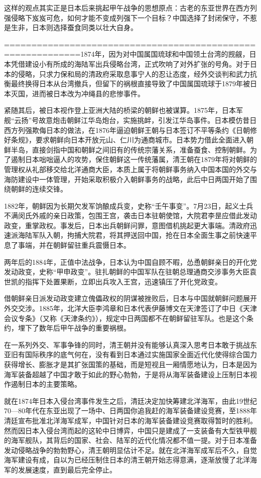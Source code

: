 \documentclass[12pt,UTF8]{ctexbook}
\begin{document}
这样的观点其实正是日本后来挑起甲午战争的思想原点：古老的东亚世界在西方列强侵略下岌岌可危，如何才能不变成列强下一个目标？中国选择了封闭保守，不惹是生非，日本则选择蚕食同类以壮大自身。

============================================================1874年，因为对中国属国琉球和中国领土台湾的觊觎，日本凭借建设小有所成的海陆军出兵侵略台湾，正式吹响了对外扩张的号角。对于日本的侵略，只求力保和局的清政府采取息事宁人的忍让态度，经外交谈判和武力抗衡最终换得日本从台湾撤兵，但留下的祸根直接导致了中国属国琉球于1879年被日本灭国，进而被日本改为冲绳县的悲惨事件。

紧随其后，被日本视作登上亚洲大陆的桥梁的朝鲜也被谋算。1875年，日本军舰“云扬”号故意炮击朝鲜江华岛炮台，实施挑衅，引发江华岛事件。日本模仿昔日西方列强欺侮日本的做法，在1876年逼迫朝鲜王朝与日本签订不平等条约《日朝修好条规》，要求朝鲜向日本开放元山、仁川为通商城市。日本势力借此全面进入朝鲜半岛，直接剑指中国和朝鲜之间旧有的传统宗藩关系，准备蚕食、控制朝鲜。为了遏制日本咄咄逼人的攻势，保住朝鲜这一传统藩属，清王朝在1879年将对朝鲜的管理权从礼部移交给北洋通商大臣，本质上属于将朝鲜事务纳入中国本国的外交与海防建设中一体管理，开始采取积极介入朝鲜事务的战略，此后中日两国开始了围绕朝鲜的连续交锋。

1882年，朝鲜因为长期欠发军饷酿成兵变，史称“壬午事变”。7月23日，起义士兵不满闵氏外戚的亲日政策，包围王宫，袭击日本驻朝使馆，大院君李昰应借此发动政变，重掌政权。事发后，日本出兵朝鲜问罪，意图借机挑起更大事端。清政府迅速派海陆军队入朝，拘捕大院君，将其押送回中国，抢在日本全面生事之前快速平息了事端，并在朝鲜留驻重兵震慑日本。

两年后的1884年，正值中法战争，日本认为中国自顾不暇，怂恿朝鲜亲日的开化党发动政变，史称“甲申政变”。驻扎朝鲜的中国军队在驻朝总理通商交涉事务大臣袁世凯的指挥下处置果断，立即出兵攻入王宫，迅速镇压了开化党政变。

借朝鲜亲日派发动政变建立傀儡政权的阴谋被挫败后，日本与中国就朝鲜问题展开外交交涉。1885年，北洋大臣李鸿章和日本代表伊藤博文在天津签订了中日《天津会议专条》（又称《天津条约》），规定中日两国都不在朝鲜留驻军队。也是这个条约，埋下了数年后甲午战争的重要祸根。

在一系列外交、军事争锋的同时，清王朝并没有能够认真深入思考日本敢于挑战东亚旧有国际秩序的底气何在，没有看到日本通过实施国家全面近代化使得综合国力获得增长、膨胀才是其扩张国策的基础，而是短视且一厢情愿地认为，日本是因为海军装备超越了中国才敢于如此的野心勃勃，于是将从海军装备建设上压制日本视作遏制日本的主要策略。

就在1874年日本入侵台湾事件发生之后，清廷决定加快筹建北洋海军，由此19世纪70—80年代在东亚出现了一场中、日两国你追我赶的海军装备建设竞赛，至1888年清廷宣布批准北洋海军成军，中国针对日本的海军装备建设竞赛取得暂时的胜利。然而因日本入侵台湾而起的这轮中日博弈，中国只是建成了一支装备有大型铁甲舰的海军舰队，其背后的国家、社会、陆军的近代化情况都不值一提。对于日本准备发动侵略战争的勃勃野心，清王朝明显估计不足。就在北洋海军成军后不久，自觉海军建设有成，自以为已经压制住日本的清王朝开始志得意满，逐渐放慢了北洋海军的发展速度，直到最后完全停止。
\end{document}
